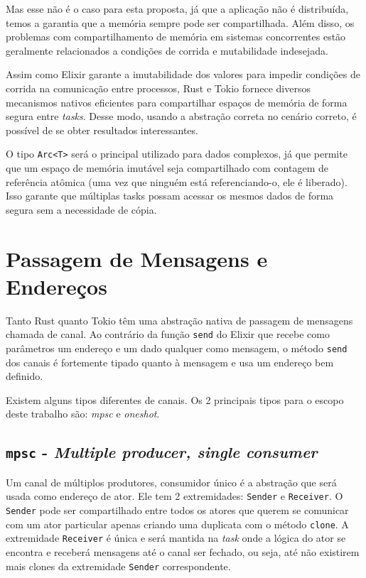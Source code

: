Mas esse não é o caso para esta proposta, já que a aplicação não é distribuída, temos a garantia que a memória sempre pode ser compartilhada. Além disso, os problemas com compartilhamento de memória em sistemas concorrentes estão geralmente relacionados a condições de corrida e mutabilidade indesejada. 

Assim como Elixir garante a imutabilidade dos valores para impedir condições de corrida na comunicação entre processos, Rust e Tokio fornece diversos mecanismos nativos eficientes para compartilhar espaços de memória de forma segura entre \emph{tasks}. Desse modo, usando a abstração correta no cenário correto, é possível de se obter resultados interessantes.

O tipo \texttt{Arc<T>} será o principal utilizado para dados complexos, já que permite que um espaço de memória imutável seja compartilhado com contagem de referência atômica (uma vez que ninguém está referenciando-o, ele é liberado). Isso garante que múltiplas tasks possam acessar os mesmos dados de forma segura sem a necessidade de cópia.

\section{Passagem de Mensagens e Endereços}

Tanto Rust quanto Tokio têm uma abstração nativa de passagem de mensagens chamada de canal. Ao contrário da função \texttt{send} do Elixir que recebe como parâmetros um endereço e um dado qualquer como mensagem, o método \texttt{send} dos canais é fortemente tipado quanto à mensagem e usa um endereço bem definido.

Existem alguns tipos diferentes de canais. Os 2 principais tipos para o escopo deste trabalho são: \emph{mpsc} e \emph{oneshot}.

\subsection{\texttt{mpsc} - \emph{Multiple producer, single consumer}}

Um canal de múltiplos produtores, consumidor único é a abstração que será usada como endereço de ator. Ele tem 2 extremidades: \texttt{Sender} e \texttt{Receiver}. O \texttt{Sender} pode ser compartilhado entre todos os atores que querem se comunicar com um ator particular apenas criando uma duplicata com o método \texttt{clone}. A extremidade \texttt{Receiver} é única e será mantida na \emph{task} onde a lógica do ator se encontra e receberá mensagens até o canal ser fechado, ou seja, até não existirem mais clones da extremidade \texttt{Sender} correspondente.

